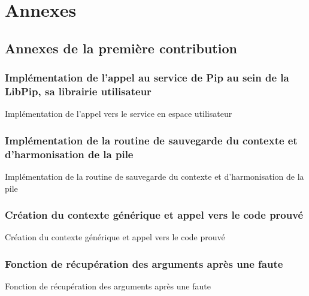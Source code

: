 \part{Annexes}

\chapter{Annexes de la première contribution}

\section{Implémentation de l'appel au service de Pip au sein de la LibPip, sa librairie utilisateur}

\begin{listing}[!ht]
	\caption{Implémentation de l'appel vers le service en espace utilisateur}
	\label{code:libpip_yield}
\end{listing}

\newpage
\section{Implémentation de la routine de sauvegarde du contexte et d'harmonisation de la pile}

\begin{codeenv}
	\caption{Implémentation de la routine de sauvegarde du contexte et d'harmonisation de la pile}
	\label{code:cg_yieldGlue}
\end{codeenv}

\newpage
\section{Création du contexte générique et appel vers le code prouvé}

\begin{codeenv}
	\caption{Création du contexte générique et appel vers le code prouvé}
	\label{code:yieldGlue}
\end{codeenv}

\newpage
\section{Fonction de récupération des arguments après une faute}

\begin{codeenv}
	\caption{Fonction de récupération des arguments après une faute}
	\label{code:faultInterruptHandler}
\end{codeenv}
